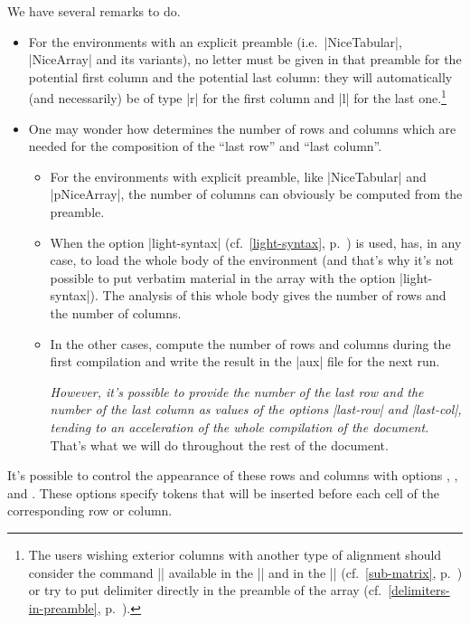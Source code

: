 \documentclass[dvipsnames]{article}
\begin{document}
\bigskip
We have several remarks to do.
\begin{itemize}[beginpenalty=10000]
\item For the environments with an explicit preamble (i.e.\ |{NiceTabular}|,
|{NiceArray}| and its variants), no letter must be given in that preamble for
the potential first column and the potential last column: they will
automatically (and necessarily) be of type |r| for the first column and |l|
for the last one.\footnote{The users wishing exterior columns with another
type of alignment should consider the command |\SubMatrix| available in the
|\CodeAfter| and in the |\CodeBefore| (cf.~\ref{sub-matrix}, p.~\pageref{sub-matrix}) or try to put
delimiter directly in the preamble of the array (cf.~\ref{delimiters-in-preamble}, p.~\pageref{delimiters-in-preamble}).} 
\item One may wonder how  determines the number of rows and
columns which are needed for the composition of the ``last row'' and ``last
column''.
\begin{itemize}
\item For the environments with explicit preamble, like |{NiceTabular}| and
|{pNiceArray}|, the number of columns can obviously be computed from the
preamble.

\item When the option |light-syntax| (cf.~\ref{light-syntax}, p.~\pageref{light-syntax}) is used,
 has, in any case, to load the whole body of the environment
(and that's why it's not possible to put verbatim material in the array with
the option |light-syntax|). The analysis of this whole body gives the number
of rows and the number of columns.

\item In the other cases,  compute the number of rows and
columns during the first compilation and write the result in the |aux| file
for the next run.

\textsl{However, it's possible to provide the number of the last row and the
number of the last column as values of the options |last-row| and |last-col|,
tending to an acceleration of the whole compilation of the document.} That's
what we will do throughout the rest of the document.
\end{itemize}
\end{itemize}

\bigskip
{}
It's possible to control the appearance of these rows and columns with options
, ,
 and . These
options specify tokens that will be inserted before each cell of the
corresponding row or column.
\end{document}
